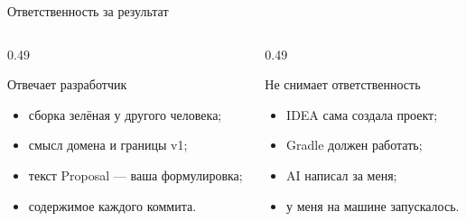 \begin{frame}{Ответственность за результат}
  \vspace{0.3em}
  \begin{columns}[T]
    \begin{column}{0.49\textwidth}
      \begin{block}{Отвечает разработчик}
        \begin{itemize}\setlength\itemsep{0.28em}
          \item сборка зелёная у другого человека;
          \item смысл домена и границы v1;
          \item текст Proposal --- ваша формулировка;
          \item содержимое каждого коммита.
        \end{itemize}
      \end{block}
    \end{column}
    \begin{column}{0.49\textwidth}
      \begin{block}{Не снимает ответственность}
        \begin{itemize}\setlength\itemsep{0.28em}
          \item IDEA \flqq сама создала проект\frqq;
          \item Gradle \flqq должен работать\frqq;
          \item AI \flqq написал за меня\frqq;
          \item \flqq у меня на машине запускалось\frqq.
        \end{itemize}
      \end{block}
    \end{column}
  \end{columns}
\end{frame}
